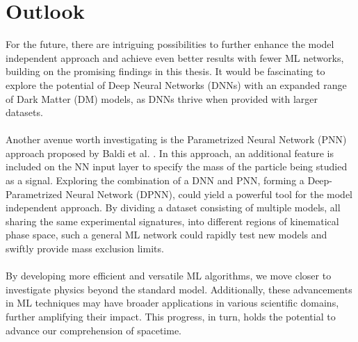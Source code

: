 \documentclass[12pt, a4paper]{book}
\begin{document}
\section{Outlook}
For the future, there are intriguing possibilities to further enhance the model independent approach and achieve even better results with fewer ML networks, building on the promising findings in this thesis. It would be fascinating to explore the potential of Deep Neural Networks (DNNs) 
with an expanded range of Dark Matter (DM) models, as DNNs thrive when provided with larger datasets.\\
\\Another avenue worth investigating is the Parametrized Neural Network (PNN) approach proposed by Baldi et al. \cite{Baldi_2016}. In this approach, an additional feature is included on the NN input layer to specify the mass of the particle being studied as a signal. 
Exploring the combination of a DNN and PNN, forming a Deep-Parametrized Neural Network (DPNN), could yield a powerful tool for the model independent approach. By dividing a dataset consisting of multiple models, all sharing the same experimental signatures, into different regions of kinematical phase space, 
such a general ML network could rapidly test new models and swiftly provide mass exclusion limits.\\
\\By developing more efficient and versatile ML algorithms, we move closer to investigate physics beyond the standard model. Additionally, these advancements in ML techniques may have broader applications in various scientific domains, further amplifying their impact.
This progress, in turn, holds the potential to advance our comprehension of spacetime.
\end{document}
